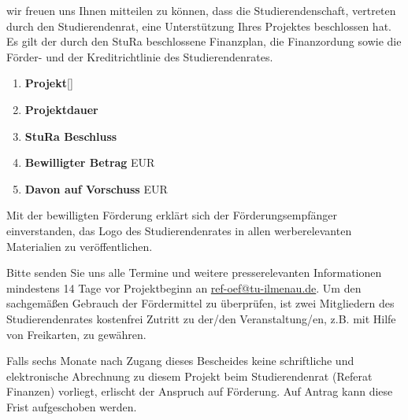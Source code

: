 wir freuen uns Ihnen mitteilen zu können, dass die Studierendenschaft, vertreten durch den Studierendenrat, eine Unterstützung Ihres Projektes beschlossen hat.
Es gilt der durch den StuRa beschlossene Finanzplan, die Finanzordung sowie die Förder- und der Kreditrichtlinie des Studierendenrates.

\begin{enumerate}[label=\Roman*]
\item \textbf{Projekt}\hfill [] 
\item \textbf{Projektdauer} \hfill {} 
\item \textbf{StuRa Beschluss} \hfill {}
\item \textbf{Bewilligter Betrag} \hfill {} EUR
\item \textbf{Davon auf Vorschuss} \hfill {} EUR
\end{enumerate}
Mit der bewilligten Förderung erklärt sich der Förderungsempfänger einverstanden, das Logo des Studierendenrates in allen werberelevanten Materialien zu veröffentlichen.

Bitte senden Sie uns alle Termine und weitere presserelevanten Informationen mindestens 14 Tage vor Projektbeginn an \href{mailto:ref-oeff@tu-ilmenau.de}{ref-oef@tu-ilmenau.de}.
Um den sachgemäßen Gebrauch der Fördermittel zu überprüfen, ist zwei
Mitgliedern des Studierendenrates kostenfrei Zutritt zu der/den Veranstaltung/en, z.B. mit Hilfe von Freikarten, zu gewähren.

Falls sechs Monate nach Zugang dieses Bescheides keine schriftliche und elektronische Abrechnung zu diesem Projekt beim Studierendenrat (Referat Finanzen) vorliegt, erlischt der Anspruch auf Förderung. Auf Antrag kann diese Frist aufgeschoben werden. 

